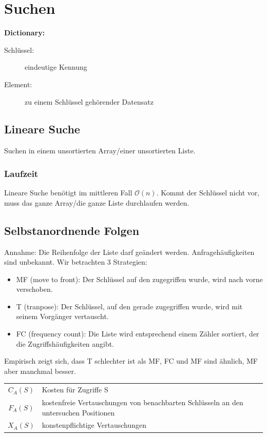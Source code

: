 \documentclass{scrartcl}
\begin{document}

\section{Suchen}

\begin{shaded}
\textbf{Dictionary:} \\
\begin{description}
	\item[Schlüssel:] eindeutige Kennung
	\item[Element:] zu einem Schlüssel gehörender Datensatz
\end{description}
\end{shaded}
\subsection{Lineare Suche}
Suchen in einem unsortierten Array/einer unsortierten Liste.
\subsubsection{Laufzeit}
Lineare Suche benötigt im mittleren Fall $\mathcal{O}(n)$. {\tiny Kommt der Schlüssel nicht vor, muss das ganze Array/die ganze Liste durchlaufen werden.}
\subsection{Selbstanordnende Folgen}
Annahme: Die Reihenfolge der Liste darf geändert werden. Anfragehäufigkeiten sind unbekannt. Wir betrachten $3$ Strategien:
\begin{itemize}
	\item MF (move to front): Der Schlüssel auf den zugegriffen wurde, wird nach vorne verschoben.
	\item T (tranpose): Der Schlüssel, auf den gerade zugegriffen wurde, wird mit seinem Vorgänger vertauscht.
	\item FC (frequency count): Die Liste wird entsprechend einem Zähler sortiert, der die Zugriffshäufigkeiten angibt.
\end{itemize}
Empirisch zeigt sich, dass T schlechter ist als MF, FC und MF sind ähnlich, MF aber manchmal besser.\\
\begin{tabular}{cp{450px}}
 $C_A(S)$ & Kosten für Zugriffe S \\ 
 $F_A(S)$ & kostenfreie Vertauschungen von benachbarten Schlüsseln an den untersuchen Positionen \\ 
 $X_A(S)$ & konstenpflichtige Vertauschungen \\  
\end{tabular}
\end{document}
